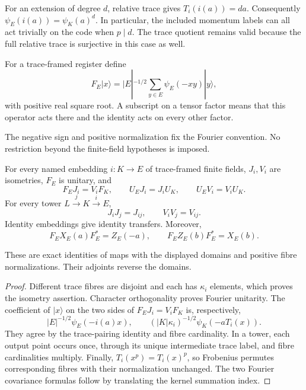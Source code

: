 For an extension of degree $d$, relative trace gives $T_i(i(a))=da$.
Consequently $\psi_E(i(a))=\psi_K(a)^d$.  In particular, the included
momentum labels can all act trivially on the code when $p\mid d$.
The trace quotient remains valid because the full relative trace is
surjective in this case as well.

\begin{definition}
For a trace-framed register define
\[
 F_E|x\rangle=|E|^{-1/2}\sum_{y\in E}\psi_E(-xy)|y\rangle,
\]
with positive real square root.  A subscript on a tensor factor means
that this operator acts there and the identity acts on every other factor.
\end{definition}
\begin{scope}
The negative sign and positive normalization fix the Fourier convention.
No restriction beyond the finite-field hypotheses is imposed.
\end{scope}

\begin{theorem}
{\normalfont\statusProved}\quad
For every named embedding $i:K\to E$ of trace-framed finite fields,
$J_i,V_i$ are isometries, $F_E$ is unitary, and
\[
 F_EJ_i=V_iF_K,\qquad U_EJ_i=J_iU_K,\qquad U_EV_i=V_iU_K.
\]
For every tower $L\xrightarrow{j}K\xrightarrow{i}E$,
\[
 J_iJ_j=J_{ij},\qquad V_iV_j=V_{ij}.
\]
Identity embeddings give identity transfers.  Moreover,
\[
 F_EX_E(a)F_E^*=Z_E(-a),\qquad F_EZ_E(b)F_E^*=X_E(b).
\]
\end{theorem}
\begin{scope}
These are exact identities of maps with the displayed domains and
positive fibre normalizations.  Their adjoints reverse the domains.
\end{scope}
\begin{proof}
Different trace fibres are disjoint and each has $\kappa_i$ elements,
which proves the isometry assertion.  Character orthogonality proves
Fourier unitarity.  The coefficient of $|x\rangle$ on the two sides of
$F_EJ_i=V_iF_K$ is, respectively,
\[
 |E|^{-1/2}\psi_E(-i(a)x),\qquad
 (|K|\kappa_i)^{-1/2}\psi_K(-aT_i(x)).
\]
They agree by the trace-pairing identity and fibre cardinality.
In a tower, each output point occurs once, through its unique intermediate
trace label, and fibre cardinalities multiply.  Finally,
$T_i(x^p)=T_i(x)^p$, so Frobenius permutes corresponding fibres with
their normalization unchanged.  The two Fourier covariance formulas
follow by translating the kernel summation index.
\end{proof}

